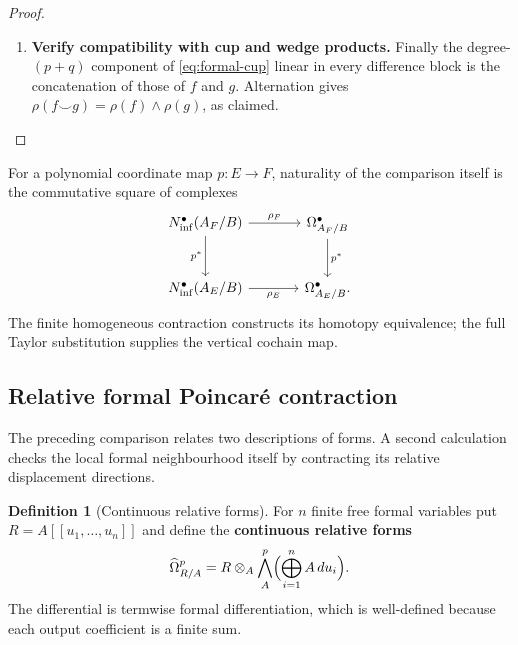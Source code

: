 \documentclass[11pt,a4paper]{article}
\numberwithin{algorithm}{section}
\numberwithin{equation}{section}
\theoremstyle{definition}
\newtheorem{definition}[definition]{Definition}
\theoremstyle{remark}
\theoremstyle{plain}
\theoremstyle{definition}
\theoremstyle{plain}
\begin{document}
\begin{proof}
\begin{enumerate}[leftmargin=*,align=left]
\item \textbf{Verify compatibility with cup and wedge products.}
Finally the degree-$(p+q)$ component of
\eqref{eq:formal-cup} linear in every difference block is the
concatenation of those of $f$ and $g$.  Alternation gives
$\rho(f\smile g)=\rho(f)\wedge\rho(g)$, as claimed.
\end{enumerate}
\end{proof}


For a polynomial coordinate map $p:E\to F$, naturality of the
comparison itself is the commutative square of complexes
\[
\begin{tikzcd}[column sep=large,row sep=large]
 N^\bullet_{\mathrm{inf}}(A_F/B) \arrow[r,"{\rho_F}"]
   \arrow[d,"{p^*}"']
   & \Omega^\bullet_{A_F/B} \arrow[d,"{p^*}"]\\
 N^\bullet_{\mathrm{inf}}(A_E/B) \arrow[r,"{\rho_E}"']
   & \Omega^\bullet_{A_E/B}.
\end{tikzcd}
\]
The finite homogeneous contraction constructs its homotopy equivalence;
the full Taylor substitution supplies the vertical cochain map.


\subsection{Relative formal Poincar\'e contraction}
\label{sec:formal-poincare}
The preceding comparison relates two descriptions of forms.
A second calculation checks the local formal neighbourhood
itself by contracting its relative displacement directions.


\begin{definition}[Continuous relative forms]\label{def:continuous-forms}
For $n$ finite free formal variables put
$R=A[[u_1,\ldots,u_n]]$ and define the \textbf{continuous relative forms}
\[
 \widehat\Omega^p_{R/A}
   =R\otimes_A\bigwedge_A^p\Bigl(\bigoplus_{i=1}^nA\,du_i\Bigr).
\]
The differential is termwise formal differentiation, which is
well-defined because each output coefficient is a finite sum.
\end{definition}
\end{document}

